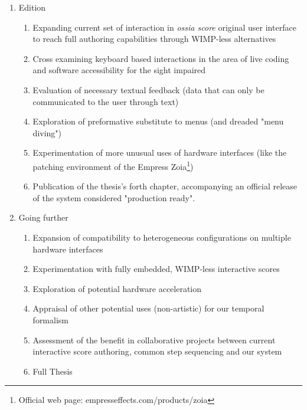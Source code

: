 \documentclass[journal,onecolumn]{IEEEtran}
\begin{document}
\begin{enumerate}
\begin{enumerate}
    \end{enumerate}
    \item Edition
    \begin{enumerate}
        \item Expanding current set of interaction in \textit{ossia score} original user interface to reach full authoring capabilities through WIMP-less alternatives
        \item Cross examining keyboard based interactions in the area of live coding and software accessibility for the sight impaired
        \item Evaluation of necessary textual feedback (data that can only be communicated to the user through text)
        \item Exploration of preformative substitute to menus (and dreaded "menu diving")
        \item Experimentation of more unusual uses of hardware interfaces (like the patching environment of the Empress Zoia\footnote{Official web page: empresseffects.com/products/zoia})
        \item Publication of the thesis's forth chapter, accompanying an official release of the system considered "production ready".
    \end{enumerate}
    \item Going further
    \begin{enumerate}
        \item Expansion of compatibility to heterogeneous configurations on multiple hardware interfaces
        \item Experimentation with fully embedded, WIMP-less interactive scores
        \item Exploration of potential hardware acceleration
        \item Appraisal of other potential uses (non-artistic) for our temporal formalism
        \item Assessment of the benefit in collaborative projects between current interactive score authoring, common step sequencing and our system
        \item Full Thesis
    \end{enumerate}
\end{enumerate}
\end{document}
